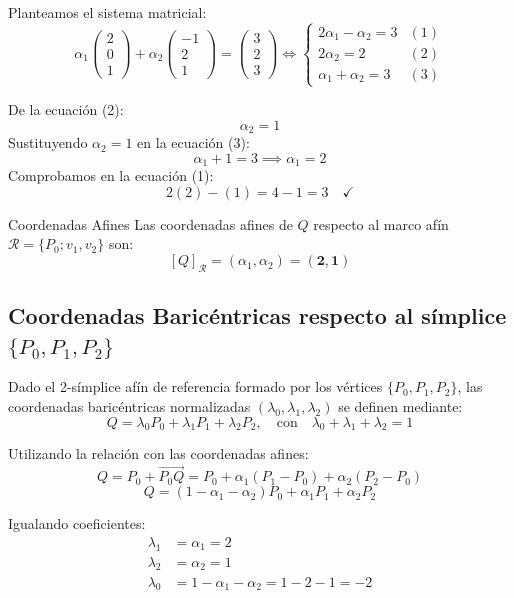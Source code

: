 \documentclass[11pt,a4paper]{article}
\begin{document}
Planteamos el sistema matricial:
\[
\alpha_1 \begin{pmatrix} 2 \\ 0 \\ 1 \end{pmatrix} + \alpha_2 \begin{pmatrix} -1 \\ 2 \\ 1 \end{pmatrix} = \begin{pmatrix} 3 \\ 2 \\ 3 \end{pmatrix} \iff \begin{cases}
2\alpha_1 - \alpha_2 = 3 & (1) \\
2\alpha_2 = 2 & (2) \\
\alpha_1 + \alpha_2 = 3 & (3)
\end{cases}
\]

De la ecuación (2):
\[
\alpha_2 = 1
\]
Sustituyendo $\alpha_2 = 1$ en la ecuación (3):
\[
\alpha_1 + 1 = 3 \implies \alpha_1 = 2
\]
Comprobamos en la ecuación (1):
\[
2(2) - (1) = 4 - 1 = 3 \quad \checkmark
\]

\begin{solbox}{Coordenadas Afines}
Las coordenadas afines de $Q$ respecto al marco afín $\mathcal{R} = \{P_0; v_1, v_2\}$ son:
\[
[Q]_{\mathcal{R}} = (\alpha_1, \alpha_2) = \bm{(2, 1)}
\]
\end{solbox}

\subsection{Coordenadas Baricéntricas respecto al símplice $\{P_0, P_1, P_2\}$}
Dado el 2-símplice afín de referencia formado por los vértices $\{P_0, P_1, P_2\}$, las coordenadas baricéntricas normalizadas $(\lambda_0, \lambda_1, \lambda_2)$ se definen mediante:
\[
Q = \lambda_0 P_0 + \lambda_1 P_1 + \lambda_2 P_2, \quad \text{con} \quad \lambda_0 + \lambda_1 + \lambda_2 = 1
\]

Utilizando la relación con las coordenadas afines:
\[
Q = P_0 + \vec{P_0 Q} = P_0 + \alpha_1(P_1 - P_0) + \alpha_2(P_2 - P_0)
\]
\[
Q = (1 - \alpha_1 - \alpha_2) P_0 + \alpha_1 P_1 + \alpha_2 P_2
\]

Igualando coeficientes:
\begin{align*}
    \lambda_1 &= \alpha_1 = 2 \\
    \lambda_2 &= \alpha_2 = 1 \\
    \lambda_0 &= 1 - \alpha_1 - \alpha_2 = 1 - 2 - 1 = -2
\end{align*}
\end{document}
